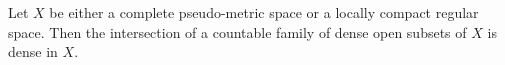 \begin{theorem}[Baire]
Let $X$ be either a complete pseudo-metric space or a locally compact regular space. Then the intersection of a countable family of dense open subsets of $X$ is dense in $X$.
\end{theorem}
